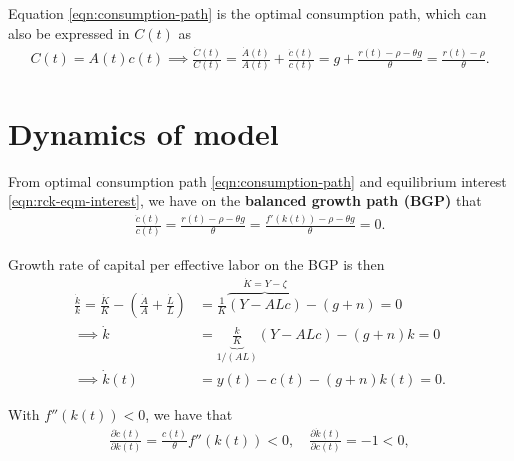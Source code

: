\documentclass[../main.tex]{subfiles}
\begin{document}
        Equation \eqref{eqn:consumption-path} is the optimal consumption path, which can also be expressed in $C(t)$ as
        \begin{align}
            C(t) = A(t) c(t) \implies
            \frac{\dot C(t)}{C(t)}
            = \frac{\dot A(t)}{A(t)} + \frac{\dot c(t)}{c(t)}
            = g + \frac{r(t) - \rho - \theta g}{\theta} = \frac{r(t) - \rho}{\theta}.
        \end{align}
        
        
    \section{Dynamics of model}
        
        From optimal consumption path \eqref{eqn:consumption-path} and equilibrium interest \eqref{eqn:rck-eqm-interest}, we have on the \textbf{balanced growth path (BGP)} that
        \begin{align}
            \frac{\dot c(t)}{c(t)}
            = \frac{r(t) - \rho - \theta g}{\theta}
            = \frac{f'(k(t)) - \rho - \theta g}{\theta}
            = 0.
            \label{eqn:RCK-c-evo}
        \end{align}
        
        
        Growth rate of capital per effective labor on the BGP is then
        \begin{align}
            \frac{\dot k}{k}
            = \frac{\dot K}{K} - \left(
                \frac{\dot A}{A} + \frac{\dot L}{L}
            \right)
            &= \frac{1}{K}
            \overbrace{(Y - ALc)}^{\dot K = Y - \zeta} - (g + n)
             = 0
            \\
            \implies
            \dot k
            &= \underbrace{\frac{k}{K}}_{1/(AL)}
            (Y - ALc) - (g + n)k
            = 0 
            \\
            \implies
            \dot k(t)
            &= y(t) - c(t) - (g + n)k(t)
            = 0.
            \label{eqn:RCK-k-evo}
        \end{align}
        
        With $f''(k(t)) < 0$, we have that
        \begin{align}
            \frac{\partial \dot c(t)}{\partial k(t)} = \frac{c(t)}{\theta} f''(k(t)) < 0,
            \quad
            \frac{\partial \dot{k}(t)}{\partial c(t)} = -1 < 0,
        \end{align}
        
\end{document}
